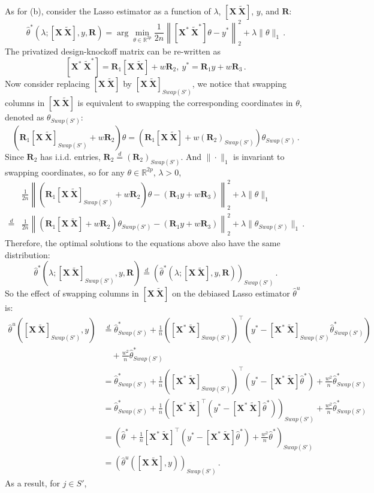 \documentclass[11pt]{article}
\newcommand{\bX}{\boldsymbol{X}}
\newcommand{\bXT}{\widetilde{\bX} }
\newcommand{\bR}{\boldsymbol{R}}
\newcommand{\mbR}{\mathbb{R}}
\newcommand{\hth}{\widehat{\theta}}
\begin{document}
As for (b), consider the Lasso estimator as a function of $\lambda$, $[\bX\ \bXT]$, $y$, and $\bR$:
\[
\hth^*(\lambda;[\bX\ \bXT],y,\bR) = \arg\min_{\theta\in\mbR^{2p}}\frac{1}{2n}\left\|[\bX^*\ \bXT^*]\theta - y^*\right\|_2^2+\lambda\|\theta\|_1\,.
\]
The privatized design-knockoff matrix can be re-written as 
\[
[\bX^*\ \bXT^*]= \bR_1[\bX\ \bXT]+w\bR_2,\ y^*=\bR_1y+w\bR_3\,.
\]
Now consider replacing $[\bX\ \bXT]$ by $[\bX\ \bXT]_{Swap(S'
)}$, we notice that swapping columns in $[\bX\ \bXT]$ is equivalent to swapping the corresponding coordinates in $\theta$, denoted as $\theta_{Swap(S')}$:
\[
(\bR_1[\bX\ \bXT]_{Swap(S')}+w\bR_2)\theta = (\bR_1[\bX\ \bXT]+w(\bR_2)_{Swap(S')})\theta_{Swap(S')}\,.
\]
Since $\bR_2$ has i.i.d. entries, $\bR_2\stackrel{d}{=}(\bR_2)_{Swap(S')}$. And $\|\cdot\|_1$ is invariant to swapping coordinates, so for any $\theta\in\mbR^{2p}$, $\lambda>0$,
\begin{align*}
    &\frac{1}{2n}\left\|(\bR_1[\bX\ \bXT]_{Swap(S')}+w\bR_2)\theta - (\bR_1y+w\bR_3)\right\|_2^2+\lambda\|\theta\|_1\\
    \stackrel{d}{=}&
\frac{1}{2n}\left\|(\bR_1[\bX\ \bXT]+w\bR_2)\theta_{Swap(S')} - (\bR_1y+w\bR_3)\right\|_2^2+\lambda\|\theta_{Swap(S')}\|_1\,.
\end{align*}
Therefore, the optimal solutions to the equations above also have the same distribution:
\[
\hth^*(\lambda;[\bX\ \bXT]_{Swap(S')},y,\bR) \stackrel{d}{=}(\hth^*(\lambda;[\bX\ \bXT],y,\bR))_{Swap(S')}\,.
\]
So the effect of swapping columns in $[\bX \ \bXT]$ on the debiased Lasso estimator $\hth^u$ is:
\begin{align*}
    \hth^u([\bX\ \bXT]_{Swap(S')},y)& \stackrel{d}{=} \hth^*_{Swap(S')} +\frac{1}{n}([\bX^*\ \bXT]_{Swap(S')})^\top(y^*-[\bX^*\ \bXT]_{Swap(S')}\hth^*_{Swap(S')})\\
    &\quad+\frac{w^2}{n }\hth^*_{Swap(S')}\\
        &=\hth^*_{Swap(S')} +\frac{1}{n}([\bX^*\ \bXT]_{Swap(S')})^\top(y^*-[\bX^*\ \bXT]\hth^*)+\frac{w^2}{n }\hth^*_{Swap(S')}\\
        &=\hth^*_{Swap(S')} +\frac{1}{n}\left([\bX^*\ \bXT]^\top(y^*-[\bX^*\ \bXT]\hth^*)\right)_{Swap(S')}+\frac{w^2}{n }\hth^*_{Swap(S')}\\
        &=\left(\hth^* +\frac{1}{n}[\bX^*\ \bXT]^\top(y^*-[\bX^*\ \bXT]\hth^*)+\frac{w^2}{n }\hth^*\right)_{Swap(S')}\\
        &=\left(\hth^u([\bX\ \bXT],y)\right)_{Swap(S')}\,.
\end{align*}
As a result, for $j\in S'$, 
\end{document}
